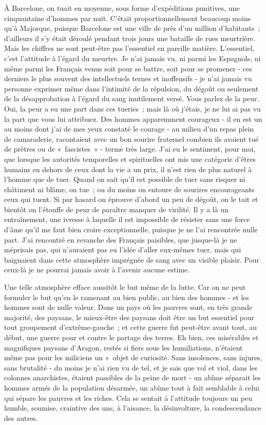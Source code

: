 \documentclass[french,twoside]{book} %
\begin{document}
À Barcelone, on tuait en moyenne, sous forme d'expéditions punitives, une cinquantaine d'hommes par nuit. C'était proportionnellement beaucoup moins qu'à Majorque, puisque Barcelone est une ville de près d'un million d'habi­tants ; d'ailleurs il s'y était déroulé pendant trois jours une bataille de rues meurtrière. Mais les chiffres ne sont peut-être pas l'essentiel en pareille matière. L'essentiel, c'est l'attitude à l'égard du meurtre. Je n'ai jamais vu, ni parmi les Espagnols, ni même parmi les Français venus soit pour se battre, soit pour se promener - ces derniers le plus souvent des intellectuels ternes et inoffensifs - je n'ai jamais vu personne exprimer même dans l'intimité de la répulsion, du dégoût ou seulement de la désapprobation à l'égard du sang inutilement versé. Vous parlez de la peur. Oui, la peur a eu une part dans ces tueries ; mais là où j'étais, je ne lui ai pas vu la part que vous lui attribuez. Des hommes apparemment courageux - il en est un au moins dont j'ai de mes yeux constaté le courage - au milieu d'un repas plein de camaraderie, racontaient avec un bon sourire fraternel combien ils avaient tué de prêtres ou de « fascis­tes » - terme très large. J'ai eu le sentiment, pour moi, que lorsque les autorités temporelles et spirituelles ont mis une catégorie d'êtres humains en dehors de ceux dont la vie a un prix, il n'est rien de plus naturel à l'homme que de tuer. Quand on sait qu'il est possible de tuer sans risquer ni châtiment ni blâme, on tue ; ou du moins on entoure de sourires encourageants ceux qui tuent. Si par hasard on éprouve d'abord un peu de dégoût, on le tait et bientôt on l'étouffe de peur de paraître manquer de virilité. Il y a là un entraînement, une ivresse à laquelle il est impossible de résister sans une force d'âme qu'il me faut bien croire exceptionnelle, puisque je ne l'ai rencontrée nulle part. J'ai rencontré en revanche des Français paisibles, que jusque-là je ne méprisais pas, qui n'auraient pas eu l'idée d'aller eux-mêmes tuer, mais qui baignaient dans cette atmosphère imprégnée de sang avec un visible plaisir. Pour ceux-là je ne pourrai jamais avoir à l'avenir aucune estime.\par
Une telle atmosphère efface aussitôt le but même de la lutte. Car on ne peut formuler le but qu'en le ramenant au bien public, au bien des hommes - et les hommes sont de nulle valeur. Dans un pays où les pauvres sont, en très grande majorité, des paysans, le mieux-être des paysans doit être un but essentiel pour tout groupement d'extrême-gauche ; et cette guerre fut peut-être avant tout, au début, une guerre pour et contre le partage des terres. Eh bien, ces misérables et magnifiques paysans d'Aragon, restés si fiers sous les humiliations, n'étaient même pas pour les miliciens un « objet de curiosité. Sans insolences, sans injures, sans brutalité - du moins je n'ai rien vu de tel, et je sais que vol et viol, dans les colonnes anarchistes, étaient passibles de la peine de mort - un abîme séparait les hommes armés de la population désarmée, un abîme tout à fait semblable à celui qui sépare les pauvres et les riches. Cela se sentait à l'attitude toujours un peu humble, soumise, craintive des uns, à l'aisance, la désinvolture, la condescendance des autres.\par
\end{document}
